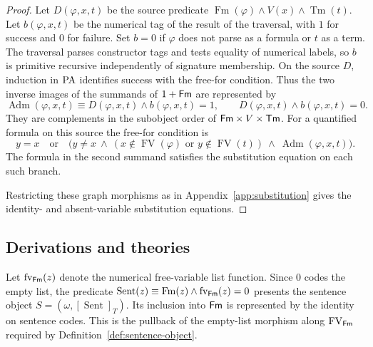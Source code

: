 \begin{proof}
Let $D(\varphi,x,t)$ be the source predicate
$\operatorname{Fm}(\varphi)\land V(x)\land\operatorname{Tm}(t)$.
Let $b(\varphi,x,t)$ be the numerical tag of the result of the
traversal, with $1$ for success and $0$ for failure. Set $b=0$ if $\varphi$ does not parse as a formula or $t$ as a term. The traversal
parses constructor tags and tests equality of numerical labels, so
$b$ is primitive recursive independently of signature membership. On the source $D$, induction in $\mathrm{PA}$
identifies success with the free-for condition. Thus the two
inverse images of the summands of $1+\mathsf{Fm}$ are represented by
\[
 \operatorname{Adm}(\varphi,x,t)\equiv D(\varphi,x,t)\land b(\varphi,x,t)=1,
 \qquad D(\varphi,x,t)\land b(\varphi,x,t)=0 .
\]
They are complements in the subobject order of $\mathsf{Fm}\times V\times\mathsf{Tm}$.
For a quantified formula on this source the free-for condition is
\[
 y=x\quad\text{or}\quad
 \bigl(y\ne x\ \land\
   (x\notin\operatorname{FV}(\varphi)
        \text{ or }y\notin\operatorname{FV}(t))\ \land\
   \operatorname{Adm}(\varphi,x,t)\bigr).
\]
The formula in the second summand satisfies the substitution equation on
each such branch.

Restricting these graph morphisms as in Appendix~\ref{app:substitution}
gives the identity- and absent-variable substitution equations.
\end{proof}


\subsection{Derivations and theories}
\label{subsec:syntactic-theories}

Let $\operatorname{fv}_{\mathsf{Fm}}(z)$ denote the numerical free-variable
list function. Since $0$ codes the empty list,
the predicate
$\operatorname{Sent}(z)\equiv
\operatorname{Fm}(z)\land\operatorname{fv}_{\mathsf{Fm}}(z)=0$
presents the sentence object
$S=(\omega,[\operatorname{Sent}]_T)$. Its inclusion into $\mathsf{Fm}$
is represented by the identity on sentence codes. This is the
pullback of the empty-list morphism along $\operatorname{FV}_{\mathsf{Fm}}$ required
by Definition~\ref{def:sentence-object}.

